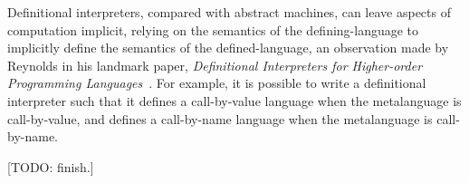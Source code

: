 Definitional interpreters, compared with abstract machines, can leave
aspects of computation implicit, relying on the semantics of the
defining-language to implicitly define the semantics of the
defined-language, an observation made by Reynolds in his landmark
paper, \emph{Definitional Interpreters for Higher-order Programming
  Languages}~\cite{dvanhorn:reynolds-acm72}.  For example, it is
possible to write a definitional interpreter such that it defines a
call-by-value language when the metalanguage is call-by-value, and
defines a call-by-name language when the metalanguage is call-by-name.

[TODO: finish.]

\newpage





